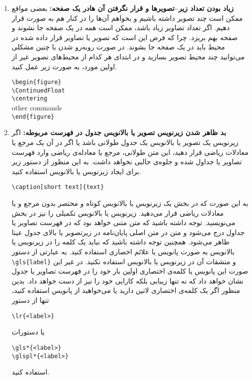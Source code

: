 \begin{enumerate}
	
	\item \textbf{زیاد بودن تعداد زیر--تصویر‌ها و قرار نگرفتن آن ‌هادر یک صفحه:}
	بعضی مواقع ممکن است چند تصویر داشته باشیم و بخواهم آن‌ها را در کنار هم به صورت 
	قرار دهیم. اگر تعداد تصاویر زیاد باشد، ممکن است همه در یک صفحه جا نشوند و صفحه بهم بریزد. چرا که فرض \lr{\LaTeX}این است که تصویر یا تصاویر قرار داده شده در محیط 
	باید در یک صفحه جا بشوند. در صورت روبه‌رو شدن با چنین مشکلی می‌توانید چند محیط تصویر بسازید و در ابتدای هر کدام از محیط‌های تصویر غیر از اولین مورد، به صورت زیر عمل کنید. 

	\begin{latin} 
		\verb|\begin{figure}|\\
		\verb|\ContinuedFloat|\\
		\verb|\centering|\\
		other commands \\
		\verb|\end{figure}|\\
	\end{latin} 

\item \textbf{بد ظاهر شدن زیرنویس  تصویر یا بالانویس  جدول در فهرست مربوطه:}
اگر زیرنویس یک  تصویر یا بالانویس یک جدول طولانی باشد یا اگر در آن یک مرجع یا معادلات ریاضی قرار دهید، این متن طولانی، مرجع یا معادله‌ی ریاضی وارد فهرست تصاویر یا جداول شده و جلوه‌ی جالبی نخواهد داشت. به این منظور از دستور زیر برای ایجاد زیرنویس یا بالانویس استفاده کنید. 
\begin{latin}
	\noindent
	\verb*|\caption[short text]{text}|
\end{latin} 
به این صورت که در بخش 
یک زیرنویس یا بالانویس کوتاه و مختصر بدون مرجع و یا معادلات ریاضی قرار می‌دهید. زیرنویس یا بالانویس تکمیلی را نیز در بخش 
می‌نویسید. توجه داشته باشید که متن 
متنی خواهد بود که در فهرست تصاویر یا جداول درج می‌شود و متن 
در متن اصلی پایان‌نامه در زیرتصویر یا بالای جدول عینا ظاهر می‌شود. همچنین توجه داشته باشید که نباید یک کلمه را در زیرنویس یا بالانویس به صورت پانویس یا علائم اخصاری استفاده کنید. به عبارتی 
از دستور 
\verb|\gls{label}|
و متشقات آن در زیرنویس یا بالانویس استفاده نکنید. در غیر این صورت این پانویس یا کلمه‌ی اختصاری اولین بار خود را در فهرست تصاویر یا جدول نشان خواهد داد که نه تنها زیبایی بلکه کارایی خود را نیز از دست خواهد داد. بدین منظور اگر یک کلمه‌ی اختصاری لاتین دارید یا می‌خواهید از پانویس استفاده کنید، تنها از دستور 
\begin{latin}
	\noindent
	\verb|\lr{<label>}|
\end{latin}
یا دستورات 
\begin{latin}
	\noindent
	\verb|\gls*{<label>}| \\
	\verb|\glspl*{<label>}| \\
\end{latin}
استفاده کنید. 


\end{enumerate}
